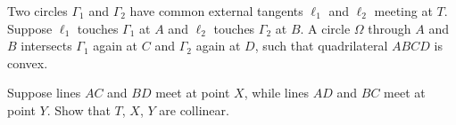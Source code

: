 Two circles $\Gamma_1$ and $\Gamma_2$ have common external tangents $\ell_1$ and $\ell_2$ meeting at $T$. Suppose $\ell_1$ touches $\Gamma_1$ at $A$ and $\ell_2$ touches $\Gamma_2$ at $B$. A circle $\Omega$ through $A$ and $B$ intersects $\Gamma_1$ again at $C$ and $\Gamma_2$ again at $D$,  such that quadrilateral $ABCD$ is convex.

Suppose lines $AC$ and $BD$ meet at point $X$,  while lines $AD$ and $BC$ meet at point $Y$. Show that $T$,  $X$,  $Y$ are collinear.
